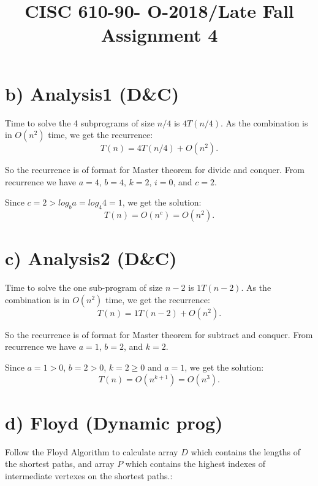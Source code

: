 \documentclass[natbib,12pt]{article}
\title{CISC 610-90- O-2018/Late Fall \linebreak Assignment 4}
\date{}
\begin{document}
	\maketitle
	
	\section*{b) Analysis1 (D\&C)}
	
	Time to solve the 4 subprograms of size $n/4$ is $4T(n/4)$. As the combination is in $O(n^2)$ time, we get the recurrence:
	\begin{equation*}
	T(n) = 4 T(n/4) + O(n^2).
	\end{equation*}
	
	So the recurrence is of format for Master theorem for divide and conquer.
	From recurrence we have $a=4$, $b=4$, $k=2$, $i=0$, and $c=2$.
	
	Since $c= 2 > log_b a = log_ 4 4 = 1$, we get the solution:
	\begin{equation*}
	T(n) = O(n^c) = O(n^2).
	\end{equation*}
	
	\section*{c) Analysis2 (D\&C)}
	Time to solve the one sub-program of size $n-2$ is $1T(n-2)$. As the combination is in $O(n^2)$ time, we get the recurrence:
	\begin{equation*}
	T(n) = 1 T(n-2) + O(n^2).
	\end{equation*}
	
	So the recurrence is of format for Master theorem for subtract and conquer. From recurrence we have $a=1$, $b=2$, and $k = 2$. 
	
	Since $a=1>0$, $b=2>0$, $k=2\ge0$ and  $a=1$, we get the solution:
	\begin{equation*}
	T(n) = O(n^{k+1}) = O(n^3).
	\end{equation*}
	
	\newpage
	\section*{d) Floyd (Dynamic prog)}
	Follow the Floyd Algorithm to calculate array $D$ which contains the lengths of the shortest paths, and array $P$ which contains the highest indexes of intermediate vertexes on the shortest paths.:
	
\end{document}
